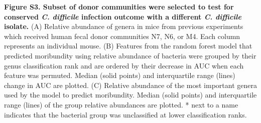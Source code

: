 \documentclass[
  12pt,
]{article}
\begin{document}
\textbf{Figure S3. Subset of donor communities were selected to test for
conserved \emph{C. difficile} infection outcome with a different
\emph{C. difficile} isolate.} (A) Relative abundance of genera in mice
from previous experiments which received human fecal donor communities
N7, N6, or M4. Each column represents an individual mouse. (B) Features
from the random forest model that predicted moribundity using relative
abundance of bacteria were grouped by their genus classification rank
and are ordered by their decrease in AUC when each feature was permuted.
Median (solid points) and interquartile range (lines) change in AUC are
plotted. (C) Relative abundance of the most important genera used by the
model to predict moribundity. Median (solid points) and interquartile
range (lines) of the group relative abundances are plotted. * next to a
name indicates that the bacterial group was unclassified at lower
classification ranks.
\end{document}
